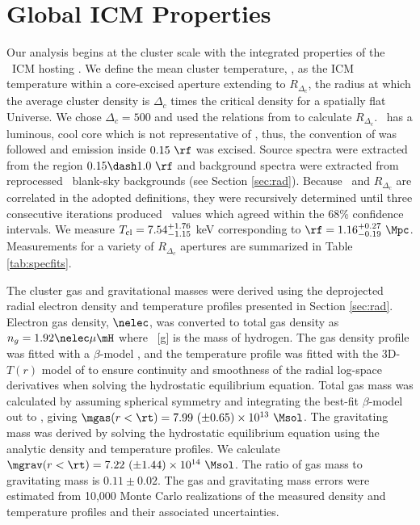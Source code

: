 \documentclass[useAMS,usenatbib]{mn2e}
\begin{document}
\section{Global ICM Properties}
\label{sec:global}

Our analysis begins at the cluster scale with the integrated
properties of the \rxj\ ICM hosting \irs. We define the mean cluster
temperature, \cltx, as the ICM temperature within a core-excised
aperture extending to $R_{\Delta_c}$, the radius at which the average
cluster density is $\Delta_c$ times the critical density for a
spatially flat Universe. We chose $\Delta_c = 500$ and used the
relations from \cite{2002A&A...389....1A} to calculate
$R_{\Delta_c}$. \irs\ has a luminous, cool core which is not
representative of \cltx, thus, the convention of
\citet{2007ApJ...668..772M} was followed and emission inside $0.15
~\rf$ was excised. Source spectra were extracted from the region $0.15
\dash 1.0~\rf$ and background spectra were extracted from reprocessed
\caldb\ blank-sky backgrounds (see Section \ref{sec:rad}). Because
\cltx\ and $R_{\Delta_c}$ are correlated in the adopted definitions,
they were recursively determined until three consecutive iterations
produced \cltx\ values which agreed within the 68\% confidence
intervals. We measure $T_{\mathrm{cl}} = 7.54^{+1.76}_{-1.15}$ keV corresponding
to $\rf = 1.16^{+0.27}_{-0.19}~\Mpc$. Measurements for a variety of
$R_{\Delta_c}$ apertures are summarized in Table \ref{tab:specfits}.

The cluster gas and gravitational masses were derived using the
deprojected radial electron density and temperature profiles presented
in Section \ref{sec:rad}. Electron gas density, $\nelec$, was
converted to total gas density as $n_g = 1.92 \nelec \mu \mH$ where
\mH\ [g] is the mass of hydrogen. The gas density profile was fitted
with a $\beta$-model \citep{betamodel}, and the temperature profile
was fitted with the 3D-$T(r)$ model of \citet{2006ApJ...640..691V} to
ensure continuity and smoothness of the radial log-space derivatives
when solving the hydrostatic equilibrium equation. Total gas mass was
calculated by assuming spherical symmetry and integrating the best-fit
$\beta$-model out to \rt, giving $\mgas(r<\rt) = 7.99 ~(\pm 0.65)
\times 10^{13} ~\Msol$. The gravitating mass was derived by solving
the hydrostatic equilibrium equation using the analytic density and
temperature profiles. We calculate $\mgrav(r<\rt) = 7.22 ~(\pm 1.44)
\times 10^{14} ~\Msol$. The ratio of gas mass to gravitating mass is
$0.11 \pm 0.02$. The gas and gravitating mass errors were estimated
from 10,000 Monte Carlo realizations of the measured density and
temperature profiles and their associated uncertainties.
\end{document}
